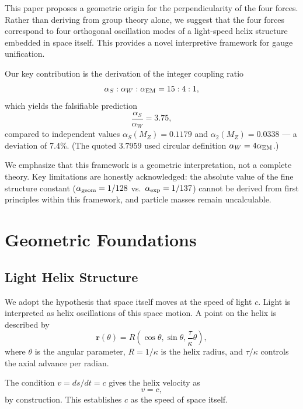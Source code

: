 \documentclass[aps,prd,10pt]{revtex4-2}
\begin{document}
This paper proposes a geometric origin for the perpendicularity of the four
forces. Rather than deriving from group theory alone, we suggest that the four
forces correspond to four orthogonal oscillation modes of a light-speed helix
structure embedded in space itself. This provides a novel interpretive framework
for gauge unification.

Our key contribution is the derivation of the integer coupling ratio
\begin{equation}
\alpha_S : \alpha_W : \alpha_{\rm EM} = 15 : 4 : 1,
\end{equation}
which yields the falsifiable prediction
\begin{equation}
\frac{\alpha_S}{\alpha_W} = 3.75,
\end{equation}
compared to independent values $\alpha_S(M_Z)=0.1179$ and $\alpha_2(M_Z)=0.0338$ ---
a deviation of 7.4\%. (The quoted $3.7959$ used circular definition $\alpha_W=4\alpha_{\rm EM}$.)

We emphasize that this framework is a geometric interpretation, not a complete
theory. Key limitations are honestly acknowledged: the absolute value of the
fine structure constant ($\alpha_{\rm geom} = 1/128$ vs.\ $\alpha_{\rm exp} = 1/137$)
cannot be derived from first principles within this framework, and particle
masses remain uncalculable.

\section{Geometric Foundations}

\subsection{Light Helix Structure}

We adopt the hypothesis that space itself moves at the speed of light $c$.
Light is interpreted as helix oscillations of this space motion. A point on the
helix is described by
\begin{equation}
\mathbf{r}(\theta) = R\left(\cos\theta, \sin\theta,
\frac{\tau}{\kappa}\theta\right),
\end{equation}
where $\theta$ is the angular parameter, $R = 1/\kappa$ is the helix radius,
and $\tau/\kappa$ controls the axial advance per radian.

The condition $v = ds/dt = c$ gives the helix velocity as
\begin{equation}
v = c,
\end{equation}
by construction. This establishes $c$ as the speed of space itself.
\end{document}
